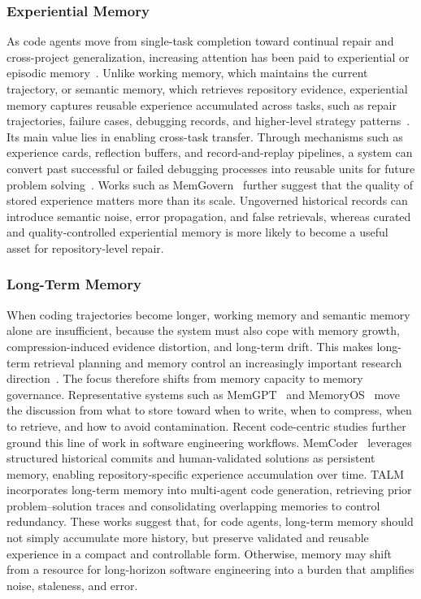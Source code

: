 \documentclass{llmxive}
\begin{document}
\subsubsection{Experiential Memory}
As code agents move from single-task completion toward continual repair and cross-project generalization, increasing attention has been paid to experiential or episodic memory~\cite{dong2025towards,huet2025episodic}. Unlike working memory, which maintains the current trajectory, or semantic memory, which retrieves repository evidence, experiential memory captures reusable experience accumulated across tasks, such as repair trajectories, failure cases, debugging records, and higher-level strategy patterns~\cite{zhao2024expel,wei2025evo,liang2026generalizable}. Its main value lies in enabling cross-task transfer. Through mechanisms such as experience cards, reflection buffers, and record-and-replay pipelines, a system can convert past successful or failed debugging processes into reusable units for future problem solving~\cite{wei2025evo,wang2026memgovern,chu2024leveraging}. 
Works such as MemGovern~\cite{wang2026memgovern} further suggest that the quality of stored experience matters more than its scale. Ungoverned historical records can introduce semantic noise, error propagation, and false retrievals, whereas curated and quality-controlled experiential memory is more likely to become a useful asset for repository-level repair.



\subsubsection{Long-Term Memory}
When coding trajectories become longer, working memory and semantic memory alone are insufficient, because the system must also cope with memory growth, compression-induced evidence distortion, and long-term drift. This makes long-term retrieval planning and memory control an increasingly important research direction~\cite{maharana2024evaluating,wang2026memex,bei2026mem,zhao2026papermind,ning2026mcsearch}. The focus therefore shifts from memory capacity to memory governance. Representative systems such as MemGPT~\cite{packer2023memgpt} and MemoryOS~\cite{kang2025memory} move the discussion from what to store toward when to write, when to compress, when to retrieve, and how to avoid contamination.
Recent code-centric studies further ground this line of work in software engineering workflows. MemCoder~\cite{deng2026your} leverages structured historical commits and human-validated solutions as persistent memory, enabling repository-specific experience accumulation over time. TALM~\cite{shen2025talm} incorporates long-term memory into multi-agent code generation, retrieving prior problem--solution traces and consolidating overlapping memories to control redundancy. These works suggest that, for code agents, long-term memory should not simply accumulate more history, but preserve validated and reusable experience in a compact and controllable form. Otherwise, memory may shift from a resource for long-horizon software engineering into a burden that amplifies noise, staleness, and error.
\end{document}
